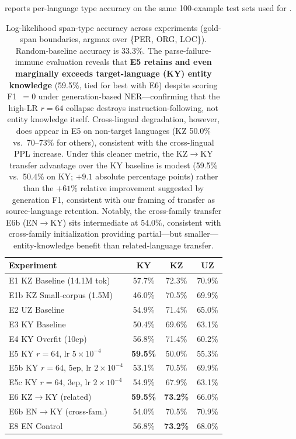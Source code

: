 \documentclass[11pt]{article}
\begin{document}
 reports per-language type accuracy on the same 100-example test sets used for .

\begin{table}[!htbp]
\centering
\small
\setlength{\tabcolsep}{6pt}
\begin{tabular}{lccc}
\toprule
\textbf{Experiment} & \textbf{KY} & \textbf{KZ} & \textbf{UZ} \\
\midrule
E1 KZ Baseline (14.1M tok)   & 57.7\% & 72.3\% & 70.9\% \\
E1b KZ Small-corpus (1.5M)   & 46.0\% & 70.5\% & 69.9\% \\
E2 UZ Baseline               & 54.9\% & 71.4\% & 65.0\% \\
E3 KY Baseline               & 50.4\% & 69.6\% & 63.1\% \\
E4 KY Overfit (10ep)         & 56.8\% & 71.4\% & 60.2\% \\
E5 KY $r{=}64$, lr $5{\times}10^{-4}$  & \textbf{59.5\%} & 50.0\% & 55.3\% \\
E5b KY $r{=}64$, 5ep, lr $2{\times}10^{-4}$ & 53.1\% & 70.5\% & 69.9\% \\
E5c KY $r{=}64$, 3ep, lr $2{\times}10^{-4}$ & 54.9\% & 67.9\% & 63.1\% \\
E6 KZ$\rightarrow$KY (related)   & \textbf{59.5\%} & \textbf{73.2\%} & 66.0\% \\
E6b EN$\rightarrow$KY (cross-fam.) & 54.0\% & 70.5\% & 70.9\% \\
E8 EN Control                & 56.8\% & \textbf{73.2\%} & 68.0\% \\
\bottomrule
\end{tabular}
\caption{Log-likelihood span-type accuracy across experiments (gold-span boundaries, argmax over \{PER, ORG, LOC\}). Random-baseline accuracy is 33.3\%. The parse-failure-immune evaluation reveals that \textbf{E5 retains and even marginally exceeds target-language (KY) entity knowledge} (59.5\%, tied for best with E6) despite scoring F1~$= 0$ under generation-based NER---confirming that the high-LR $r{=}64$ collapse destroys instruction-following, not entity knowledge itself. Cross-lingual degradation, however, does appear in E5 on non-target languages (KZ 50.0\% vs.\ 70--73\% for others), consistent with the cross-lingual PPL increase. Under this cleaner metric, the KZ$\rightarrow$KY transfer advantage over the KY baseline is modest (59.5\% vs.\ 50.4\% on KY; $+9.1$ absolute percentage points) rather than the $+61\%$ relative improvement suggested by generation F1, consistent with our framing of transfer as source-language retention. Notably, the cross-family transfer E6b (EN$\rightarrow$KY) sits intermediate at $54.0\%$, consistent with cross-family initialization providing partial---but smaller---entity-knowledge benefit than related-language transfer.}
\label{tab:ner_loglik}
\end{table}
\end{document}
